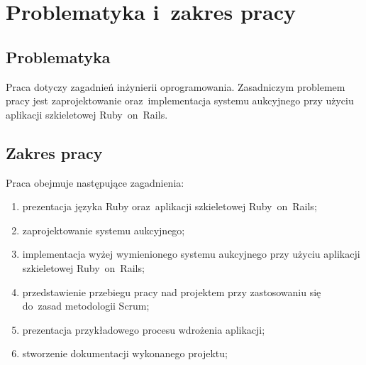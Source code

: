 \section{Problematyka i~zakres pracy} \label{problematyka}

\subsection{Problematyka} \label{problematyka.problematyka}

Praca dotyczy zagadnień inżynierii oprogramowania. Zasadniczym problemem pracy jest zaprojektowanie oraz~implementacja systemu aukcyjnego przy użyciu aplikacji szkieletowej Ruby~on~Rails.

\subsection{Zakres pracy} \label{problematyka.zakres}

Praca obejmuje następujące zagadnienia:

\begin{enumerate}
  \item prezentacja języka Ruby oraz~aplikacji szkieletowej Ruby~on~Rails;
  \item zaprojektowanie systemu aukcyjnego;
  \item implementacja wyżej wymienionego systemu aukcyjnego przy użyciu aplikacji szkieletowej Ruby~on~Rails;
  \item przedstawienie przebiegu pracy nad projektem przy zastosowaniu się do~zasad metodologii Scrum;
  \item prezentacja przykładowego procesu wdrożenia aplikacji;
  \item stworzenie dokumentacji wykonanego projektu;
\end{enumerate}
